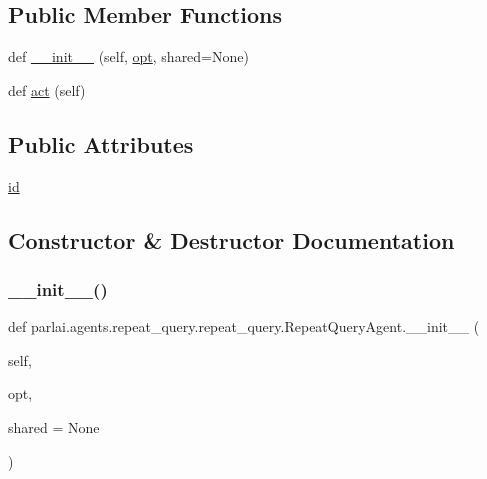 \subsection*{Public Member Functions}
\begin{DoxyCompactItemize}
\item 
def \hyperlink{classparlai_1_1agents_1_1repeat__query_1_1repeat__query_1_1RepeatQueryAgent_a1ebfe807ecdf068282d681b5047b035a}{\+\_\+\+\_\+init\+\_\+\+\_\+} (self, \hyperlink{classparlai_1_1core_1_1agents_1_1Agent_ab3b45d2754244608c75d4068b90cd051}{opt}, shared=None)
\item 
def \hyperlink{classparlai_1_1agents_1_1repeat__query_1_1repeat__query_1_1RepeatQueryAgent_a7db5db4eda3e033a9022a4f4fe74419b}{act} (self)
\end{DoxyCompactItemize}
\subsection*{Public Attributes}
\begin{DoxyCompactItemize}
\item 
\hyperlink{classparlai_1_1agents_1_1repeat__query_1_1repeat__query_1_1RepeatQueryAgent_ab6fbd1dbd2b197d0ab72d3f9f11c9d8a}{id}
\end{DoxyCompactItemize}


\subsection{Constructor \& Destructor Documentation}
\mbox{\label{classparlai_1_1agents_1_1repeat__query_1_1repeat__query_1_1RepeatQueryAgent_a1ebfe807ecdf068282d681b5047b035a}} 
\subsubsection{\texorpdfstring{\+\_\+\+\_\+init\+\_\+\+\_\+()}{\_\_init\_\_()}}
{\footnotesize\ttfamily def parlai.\+agents.\+repeat\+\_\+query.\+repeat\+\_\+query.\+Repeat\+Query\+Agent.\+\_\+\+\_\+init\+\_\+\+\_\+ (\begin{DoxyParamCaption}\item[{}]{self,  }\item[{}]{opt,  }\item[{}]{shared = {\ttfamily None} }\end{DoxyParamCaption})}




